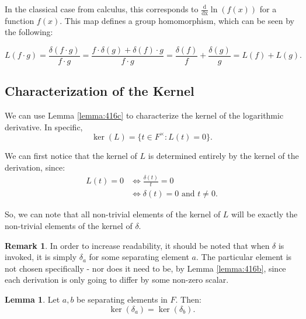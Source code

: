 \documentclass{article}
\theoremstyle{definition}
\newtheorem{remark}{Remark}
\newtheorem{lemma}{Lemma}
\newcommand{\6}{\mathbf}
\newcommand{\7}{\mathcal}
\begin{document}

In the classical case from calculus, this corresponds to $\frac{\mathrm{d}}{\mathrm{dx}} \ln(f(x))$ for a function $f(x)$. 
This map defines a group homomorphism, which can be seen by the following:

\medskip

$$L(f \cdot g) = \frac{\delta(f \cdot g)}{f \cdot g} = \frac{f \cdot \delta(g) + \delta(f) \cdot g}{f \cdot g} = \frac{\delta(f)}{f} + \frac{\delta(g)}{g} = L(f) + L(g).$$




\subsection{Characterization of the Kernel}

We can use Lemma \ref{lemma:416c} to characterize the kernel of the logarithmic derivative. In specific,
$$\ker(L) = \{t \in F^{\times} : L(t) = 0 \}.$$

We can first notice that the kernel of $L$ is determined entirely by the kernel of the derivation, since:
\begin{align*}
    L(t) = 0 &\Leftrightarrow \frac{\delta(t)}{t} = 0 \\
    &\Leftrightarrow \delta(t) = 0 \text{ and } t \neq 0.
\end{align*}

So, we can note that all non-trivial elements of the kernel of $L$ will be exactly the non-trivial elements of the kernel of $\delta$. 

\medskip 

\begin{remark}
    In order to increase readability, it should be noted that when $\delta$ is invoked, it is simply $\delta_a$ for some separating element $a$. The particular element is not chosen specifically - nor does it need to be, by Lemma \ref{lemma:416b}, since each derivation is only going to differ by some non-zero scalar. 
\end{remark}



\begin{lemma} Let $a,b$ be separating elements in $F$. Then:
$$\ker(\delta_a) = \ker(\delta_b).$$
\end{lemma}
\end{document}
